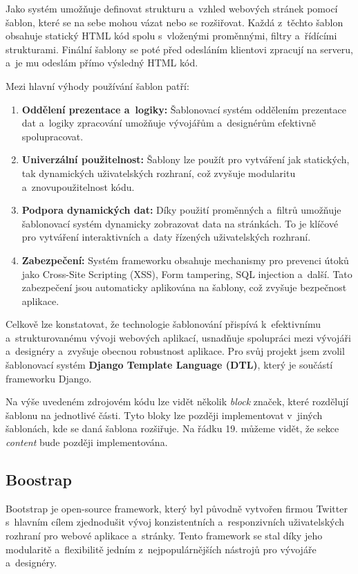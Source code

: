 Jako systém umožňuje definovat strukturu a~vzhled webových stránek pomocí šablon, které se na sebe mohou vázat nebo se rozšiřovat. Každá z~těchto šablon obsahuje statický HTML kód spolu s~vloženými proměnnými, filtry a~řídícími strukturami. Finální šablony se poté před odesláním klientovi zpracují na serveru, a~je mu odeslám přímo výsledný HTML kód.

\noindent
Mezi hlavní výhody používání šablon patří:
\begin{enumerate}
    \item \textbf{Oddělení prezentace a~logiky:} Šablonovací systém oddělením prezentace dat a~logiky zpracování umožňuje vývojářům a~designérům efektivně spolupracovat.
    \item \textbf{Univerzální použitelnost:} Šablony lze použít pro vytváření jak statických, tak dynamických uživatelských rozhraní, což zvyšuje modularitu a~znovupoužitelnost kódu.
    \item \textbf{Podpora dynamických dat:} Díky použití proměnných a~filtrů umožňuje šablonovací systém dynamicky zobrazovat data na stránkách. To je klíčové pro vytváření interaktivních a~daty řízených uživatelských rozhraní.
    \item \textbf{Zabezpečení:} Systém frameworku obsahuje mechanismy pro prevenci útoků jako Cross-Site Scripting (XSS), Form tampering, SQL injection a~další. Tato zabezpečení jsou automaticky aplikována na šablony, což zvyšuje bezpečnost aplikace.
\end{enumerate}

Celkově lze konstatovat, že technologie šablonování přispívá k~efektivnímu a~strukturovanému vývoji webových aplikací, usnadňuje spolupráci mezi vývojáři a~designéry a~zvyšuje obecnou robustnost aplikace. Pro svůj projekt jsem zvolil šablonovací systém \textbf{Django Template Language (DTL)}, který je součástí frameworku Django.



Na výše uvedeném zdrojovém kódu lze vidět několik \textit{block} značek, které rozdělují šablonu na jednotlivé části. Tyto bloky lze později implementovat v~jiných šablonách, kde se daná šablona rozšiřuje. Na řádku 19. můžeme vidět, že sekce \textit{content} bude později implementována.

\subsection{Boostrap}
\label{subsec:dev-technology-bootstrap}
Bootstrap je open-source framework, který byl původně vytvořen firmou Twitter s~hlavním cílem zjednodušit vývoj konzistentních a~responzivních uživatelských rozhraní pro webové aplikace a~stránky. Tento framework se stal díky jeho modularitě a~flexibilitě jedním z~nejpopulárnějších nástrojů pro vývojáře a~designéry.

